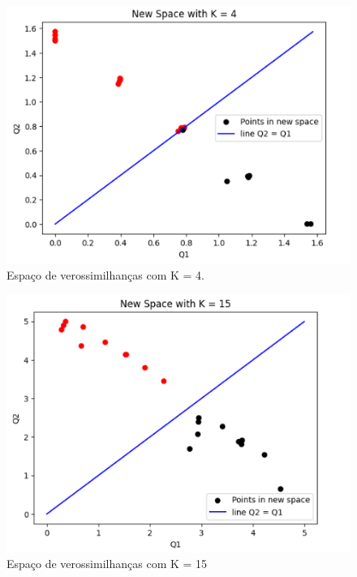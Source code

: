 \documentclass{article} %
\begin{document}
\begin{figure}[h] %
    \centering %
    \includegraphics[width=1\linewidth]{k4.png} %
    \caption{Espaço de verossimilhanças com K = 4.} %
    \label{fig:exemplo} %
\end{figure}

\begin{figure}[h] %
    \centering %
    \includegraphics[width=1\linewidth]{k15.png} %
    \caption{Espaço de verossimilhanças com K = 15} %
    \label{fig:exemplo} %
\end{figure}
\end{document}
